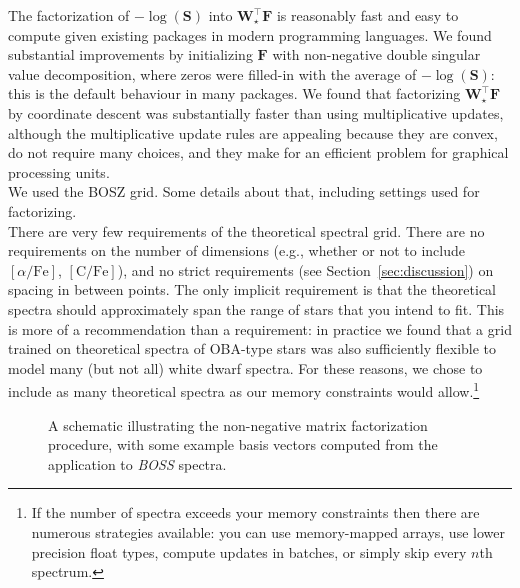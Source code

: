 \documentclass[modern]{aastex631}
\renewcommand{\vec}[1]{\mathbf{#1}}
\newcommand{\vecalpha}{\boldsymbol{\alpha}}
\newcommand{\transpose}{^\top}
\newcommand{\todo}[1]{\textcolor{tab:red}{#1}}
\begin{document}
The factorization of $-\log\left({\vec{S}}\right)$ into $\vec{W}_\star\transpose\vec{F}$ is reasonably fast and easy to compute given existing packages in modern programming languages. We found substantial improvements by initializing $\vec{F}$ with non-negative double singular value decomposition, where zeros were filled-in with the average of $-\log\left({\vec{S}}\right)$: this is the default behaviour in many packages. We found that factorizing $\vec{W}_\star\transpose\vec{F}$ by coordinate descent was substantially faster than using multiplicative updates, although the multiplicative update rules are appealing because they are convex, do not require many choices, and they make for an efficient problem for graphical processing units.\\

\todo{We used the BOSZ grid. Some details about that, including settings used for factorizing.}\\

There are very few requirements of the theoretical spectral grid. There are no requirements on the number of dimensions (e.g., whether or not to include $[\alpha/\mathrm{Fe}]$, $[\mathrm{C/Fe}]$), and no strict requirements (see Section~\ref{sec:discussion}) on spacing in between points. The only implicit requirement is that the theoretical spectra should approximately span the range of stars that you intend to fit. This is more of a recommendation than a requirement: in practice we found that a grid trained on theoretical spectra of OBA-type stars was also sufficiently flexible to model many (but not all) white dwarf spectra. For these reasons, we chose to include as many theoretical spectra as our memory constraints would allow.\footnote{If the number of spectra exceeds your memory constraints then there are numerous strategies available: you can use memory-mapped arrays, use lower precision float types, compute updates in batches, or simply skip every $n$th spectrum.}\\


\begin{figure*}
    \caption{A schematic illustrating the non-negative matrix factorization procedure, with some example basis vectors computed from the application to \emph{BOSS} spectra. \label{fig:schematic}}
\end{figure*}


\end{document}
